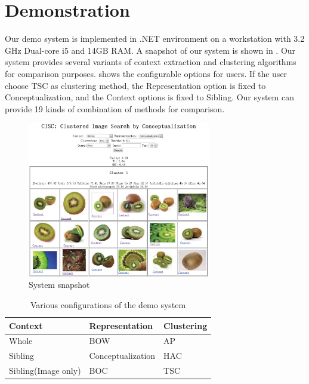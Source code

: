 \section{Demonstration}
Our demo system is implemented in .NET environment on a workstation with
3.2 GHz Dual-core i5 and 14GB RAM.
A snapshot of our system is shown in . Our system provides
 several variants of context extraction and clustering algorithms
for comparison purposes.
  shows the configurable options for users.
If the user choose TSC as clustering method, the Representation option is
fixed to Conceptualization, and the Context options is fixed to Sibling.
 Our system can provide 19 kinds of combination of methods for comparison.

\begin{figure}[th]
\begin{center}
\centering
\includegraphics[width=80mm]{sysdemo.eps}
\caption{System snapshot}
\label{fig:sysdemo}
\end{center}
\end{figure}

\begin{table}[th]
\centering \small
\caption{Various configurations of the demo system}
\begin{tabular}{|l|l|l|}
\hline
{\bf Context} & {\bf Representation} & {\bf Clustering} \\
\hline
      Whole &        BOW &         AP \\

   Sibling &        Conceptualization &        HAC \\

Sibling(Image only) &        BOC &           TSC \\
\hline
\end{tabular}
\label{tab:op}
\end{table}

